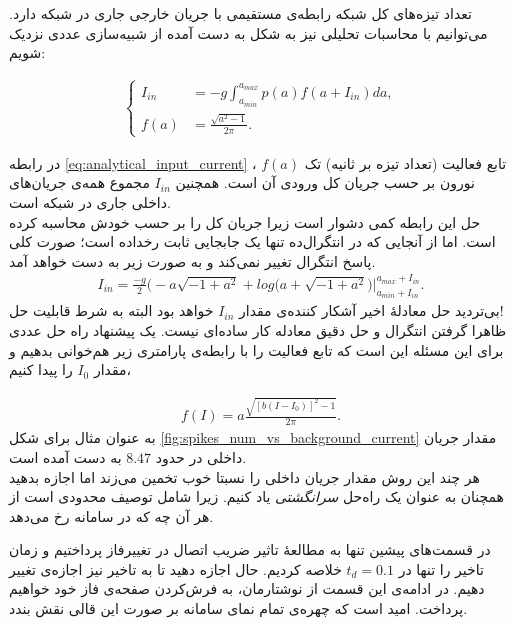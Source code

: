تعداد تیزه‌های کل شبکه رابطه‌ی مستقیمی با جریان خارجی جاری در شبکه دارد. می‌توانیم با محاسبات تحلیلی نیز به شکل به دست آمده از شبیه‌سازی عددی نزدیک شویم:

\begin{align}
	\begin{cases}
		I_{in} &= -g \int_{a_{min}}^{a_{max}} p(a) f(a + I_{in}) da, \\
		f(a) &= \frac{\sqrt{a^2 - 1}}{2\pi}.
	\end{cases}
	\label{eq:analytical_input_current}
\end{align}

در رابطه \ref{eq:analytical_input_current} ، $f(a)$ تابع فعالیت (تعداد تیزه بر ثانیه) تک نورون بر حسب جریان کل ورودی آن است. همچنین $I_{in}$ مجموع همه‌ی جریان‌های داخلی جاری در شبکه است.\\

حل این رابطه کمی دشوار است زیرا جریان کل را بر حسب خودش محاسبه کرده است. اما از آنجایی که در انتگرال‌ده تنها یک جابجایی ثابت رخداده است؛ صورت کلی پاسخ انتگرال تغییر نمی‌کند و به صورت زیر به دست خواهد آمد.
\begin{align}
	I_{in} = \frac{-g}{2} \bigg(-a \sqrt{-1 + a^2} + log(a + \sqrt{-1 + a^2}\bigg) \Big|_{a_{min} + I_{in}}^{a_{max} + I_{in}} .
\end{align}
بی‌تردید حل معادلهٔ اخیر آشکار کننده‌ی مقدار
$I_{in}$
خواهد بود البته به شرط قابلیت حل!\\

ظاهرا گرفتن انتگرال و حل دقیق معادله کار ساده‌ای نیست. یک پیشنهاد راه حل عددی برای این مسئله این است که تابع فعالیت را با رابطه‌ی پارامتری زیر هم‌خوانی بدهیم و مقدار 
$I_0$
را پیدا کنیم،

\begin{align}
	f(I) = a \frac{\sqrt{[b(I - I_0 )]^2 - 1}}{2\pi} .
\end{align}
به عنوان مثال برای شکل
\ref{fig:spikes_num_vs_background_current}
مقدار جریان داخلی در حدود 
$8.47$
به دست آمده است.\\

هر چند این روش مقدار جریان داخلی را نسبتا خوب تخمین می‌زند اما اجازه بدهید همچنان به عنوان یک راه‌حل 
\emph{
سرانگشتی
}
یاد کنیم. زیرا شامل توصیف محدودی است از هر آن چه که در سامانه رخ می‌دهد.

در قسمت‌های پیشین تنها به مطالعهٔ تاثیر ضریب اتصال در تغییرفاز پرداختیم و زمان تاخیر را تنها در $t_d = 0.1$ خلاصه کردیم. حال اجازه دهید تا به تاخیر نیز اجازه‌ی تغییر دهیم. در ادامه‌ی این قسمت از نوشتارمان، به فرش‌کردن صفحه‌ی فاز خود خواهیم پرداخت. امید است که چهره‌ی تمام نمای سامانه‌ بر صورت این قالی نقش بندد.\\


